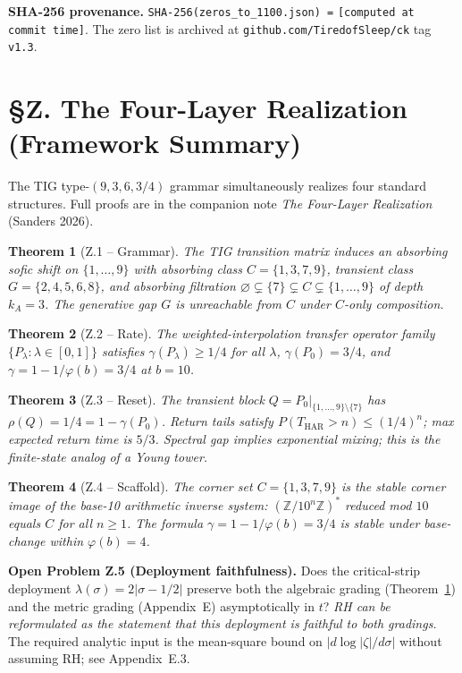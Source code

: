 \documentclass[11pt]{article}
\newtheorem{theorem}{Theorem}
\begin{document}
\textbf{SHA-256 provenance.}
\texttt{SHA-256(zeros\_to\_1100.json) =}
\texttt{[computed at commit time]}.
The zero list is archived at \texttt{github.com/TiredofSleep/ck} tag \texttt{v1.3}.


\section*{\S Z. The Four-Layer Realization (Framework Summary)}

The TIG type-$(9,3,6,3/4)$ grammar simultaneously realizes four standard structures.
Full proofs are in the companion note \emph{The Four-Layer Realization} (Sanders 2026).

\begin{theorem}[Z.1 -- Grammar]\label{thm:Z1}
The TIG transition matrix induces an absorbing sofic shift on $\{1,\ldots,9\}$ with
absorbing class $C = \{1,3,7,9\}$, transient class $G = \{2,4,5,6,8\}$, and absorbing
filtration $\varnothing \subsetneq \{7\} \subsetneq C \subsetneq \{1,\ldots,9\}$ of depth $k_A = 3$.
The generative gap $G$ is unreachable from $C$ under $C$-only composition.
\end{theorem}

\begin{theorem}[Z.2 -- Rate]\label{thm:Z2}
The weighted-interpolation transfer operator family $\{P_\lambda : \lambda \in [0,1]\}$ satisfies
$\gamma(P_\lambda) \geq 1/4$ for all $\lambda$,
$\gamma(P_0) = 3/4$,
and $\gamma = 1 - 1/\varphi(b) = 3/4$ at $b=10$.
\end{theorem}

\begin{theorem}[Z.3 -- Reset]\label{thm:Z3}
The transient block $Q = P_0|_{\{1,\ldots,9\}\setminus\{7\}}$ has $\rho(Q) = 1/4 = 1-\gamma(P_0)$.
Return tails satisfy $P(T_{\mathrm{HAR}} > n) \leq (1/4)^n$; max expected return time is $5/3$.
Spectral gap implies exponential mixing; this is the finite-state analog of a Young tower.
\end{theorem}

\begin{theorem}[Z.4 -- Scaffold]\label{thm:Z4}
The corner set $C = \{1,3,7,9\}$ is the stable corner image of the base-10 arithmetic
inverse system: $(\mathbb{Z}/10^n\mathbb{Z})^*$ reduced mod $10$ equals $C$ for all $n \geq 1$.
The formula $\gamma = 1 - 1/\varphi(b) = 3/4$ is stable under base-change within $\varphi(b)=4$.
\end{theorem}

\noindent\textbf{Open Problem Z.5 (Deployment faithfulness).}
Does the critical-strip deployment $\lambda(\sigma) = 2|\sigma - 1/2|$ preserve both
the algebraic grading (Theorem~\ref{thm:Z1}) and the metric grading (Appendix~E)
asymptotically in $t$?
\emph{RH can be reformulated as the statement that this deployment is faithful to both gradings.}
The required analytic input is the mean-square bound on $|d\log|\zeta|/d\sigma|$ without assuming RH\@;
see Appendix~E.3.
\end{document}
